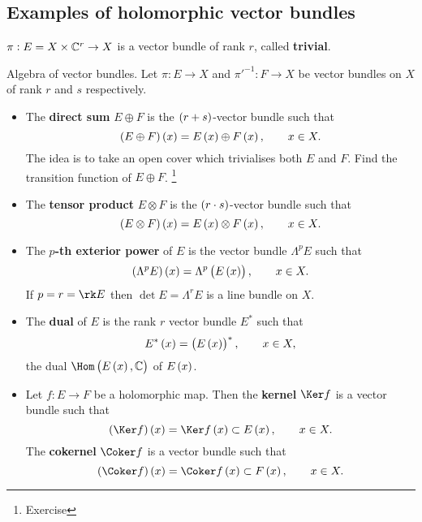 \pagebreak

\subsection{Examples of holomorphic vector bundles}

\begin{example}
$ \pi : E = X \times \mathbb{C}^r \to X $ is a vector bundle of rank $ r $, called \textbf{trivial}.
\end{example}

\begin{example}
Algebra of vector bundles. Let $ \pi : E \to X $ and $ \pi'^{-1} : F \to X $ be vector bundles on $ X $ of rank $ r $ and $ s $ respectively.
\begin{itemize}
\item The \textbf{direct sum} $ E \oplus F $ is the $ \br{r + s} $-vector bundle such that
$$ \br{E \oplus F}\br{x} = E\br{x} \oplus F\br{x}, \qquad x \in X. $$
The idea is to take an open cover which trivialises both $ E $ and $ F $. Find the transition function of $ E \oplus F $. \footnote{Exercise}
\item The \textbf{tensor product} $ E \otimes F $ is the $ \br{r \cdot s} $-vector bundle such that
$$ \br{E \otimes F}\br{x} = E\br{x} \otimes F\br{x}, \qquad x \in X. $$
\item The \textbf{$ p $-th exterior power} of $ E $ is the vector bundle $ \Lambda^pE $ such that
$$ \br{\Lambda^pE}\br{x} = \Lambda^p\br{E\br{x}}, \qquad x \in X. $$
If $ p = r = \rk E $ then $ \det E = \Lambda^rE $ is a line bundle on $ X $.
\item The \textbf{dual} of $ E $ is the rank $ r $ vector bundle $ E^* $ such that
$$ E^*\br{x} = \br{E\br{x}}^*, \qquad x \in X, $$
the dual $ \Hom\br{E\br{x}, \CC} $ of $ E\br{x} $.
\item Let $ f : E \to F $ be a holomorphic map. Then the \textbf{kernel} $ \Ker f $ is a vector bundle such that
$$ \br{\Ker f}\br{x} = \Ker f\br{x} \subset E\br{x}, \qquad x \in X. $$
The \textbf{cokernel} $ \Coker f $ is a vector bundle such that
$$ \br{\Coker f}\br{x} = \Coker f\br{x} \subset F\br{x}, \qquad x \in X. $$
\end{itemize}
\end{example}


